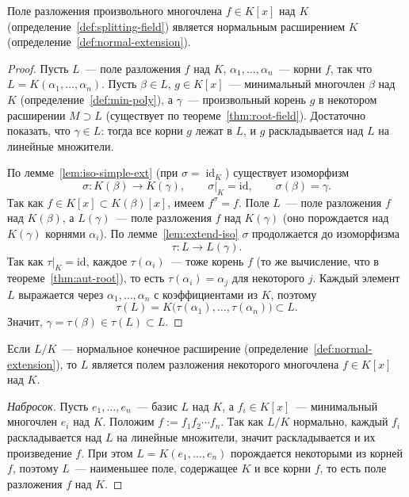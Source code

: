 \documentclass[12pt]{article}
\begin{document}
	\begin{theorem}\label{thm:splitting-normal}
		Поле разложения произвольного многочлена $f \in K[x]$ над $K$ (определение~\ref{def:splitting-field}) является нормальным расширением $K$ (определение~\ref{def:normal-extension}).
	\end{theorem}
	\begin{proof}
		Пусть $L$~--- поле разложения $f$ над $K$, $\alpha_1, \ldots, \alpha_n$~--- корни $f$, так что $L = K(\alpha_1, \ldots, \alpha_n)$. Пусть $\beta \in L$, $g \in K[x]$~--- минимальный многочлен $\beta$ над $K$ (определение~\ref{def:min-poly}), а $\gamma$~--- произвольный корень $g$ в некотором расширении $M \supset L$ (существует по теореме~\ref{thm:root-field}). Достаточно показать, что $\gamma \in L$: тогда все корни $g$ лежат в $L$, и $g$ раскладывается над $L$ на линейные множители.

		По лемме~\ref{lem:iso-simple-ext} (при $\sigma = \operatorname{id}_K$) существует изоморфизм
		\[
			\sigma: K(\beta) \to K(\gamma), \qquad \sigma|_K = \mathrm{id}, \qquad \sigma(\beta)=\gamma.
		\]
		Так как $f \in K[x] \subset K(\beta)[x]$, имеем $f^\sigma = f$. Поле $L$~--- поле разложения $f$ над $K(\beta)$, а $L(\gamma)$~--- поле разложения $f$ над $K(\gamma)$ (оно порождается над $K(\gamma)$ корнями $\alpha_i$). По лемме~\ref{lem:extend-iso} $\sigma$ продолжается до изоморфизма
		\[
			\tau: L \to L(\gamma).
		\]
		Так как $\tau|_K = \mathrm{id}$, каждое $\tau(\alpha_i)$~--- тоже корень $f$ (то же вычисление, что в теореме~\ref{thm:aut-root}), то есть $\tau(\alpha_i) = \alpha_j$ для некоторого $j$. Каждый элемент $L$ выражается через $\alpha_1, \ldots, \alpha_n$ с коэффициентами из $K$, поэтому
		\[
			\tau(L) = K\bigl(\tau(\alpha_1), \ldots, \tau(\alpha_n)\bigr) \subset L.
		\]
		Значит, $\gamma = \tau(\beta) \in \tau(L) \subset L$.
	\end{proof}

	\begin{statement}\label{stat:normal-is-splitting}
		Если $L/K$~--- нормальное конечное расширение (определение~\ref{def:normal-extension}), то $L$ является полем разложения некоторого многочлена $f \in K[x]$ над $K$.
	\end{statement}
	\begin{proof}[Набросок]
		Пусть $e_1, \ldots, e_n$~--- базис $L$ над $K$, а $f_i \in K[x]$~--- минимальный многочлен $e_i$ над $K$. Положим $f := f_1 f_2 \cdots f_n$. Так как $L/K$ нормально, каждый $f_i$ раскладывается над $L$ на линейные множители, значит раскладывается и их произведение $f$. При этом $L = K(e_1,\ldots,e_n)$ порождается некоторыми из корней $f$, поэтому $L$~--- наименьшее поле, содержащее $K$ и все корни $f$, то есть поле разложения $f$ над $K$.
	\end{proof}
\end{document}

